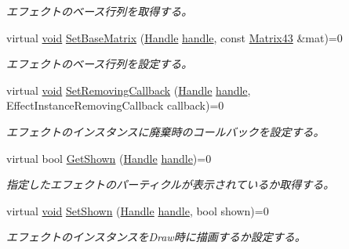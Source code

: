 \begin{DoxyCompactItemize}
\begin{DoxyCompactList}\small\item\em エフェクトのベース行列を取得する。 \end{DoxyCompactList}\item 
virtual \mbox{\hyperlink{namespace_effekseer_ab34c4088e512200cf4c2716f168deb56}{void}} \mbox{\hyperlink{class_effekseer_1_1_manager_a0f94ad0b6cd362283bc216515a89822c}{Set\+Base\+Matrix}} (\mbox{\hyperlink{namespace_effekseer_afba58b8d812da862190e9bbfc040824a}{Handle}} \mbox{\hyperlink{namespace_effekseer_afd99b336b206999bdcca3e431648efbc}{handle}}, const \mbox{\hyperlink{struct_effekseer_1_1_matrix43}{Matrix43}} \&mat)=0
\begin{DoxyCompactList}\small\item\em エフェクトのベース行列を設定する。 \end{DoxyCompactList}\item 
virtual \mbox{\hyperlink{namespace_effekseer_ab34c4088e512200cf4c2716f168deb56}{void}} \mbox{\hyperlink{class_effekseer_1_1_manager_a62c24747994008dfcb84a0adcd53b3ad}{Set\+Removing\+Callback}} (\mbox{\hyperlink{namespace_effekseer_afba58b8d812da862190e9bbfc040824a}{Handle}} \mbox{\hyperlink{namespace_effekseer_afd99b336b206999bdcca3e431648efbc}{handle}}, Effect\+Instance\+Removing\+Callback callback)=0
\begin{DoxyCompactList}\small\item\em エフェクトのインスタンスに廃棄時のコールバックを設定する。 \end{DoxyCompactList}\item 
virtual bool \mbox{\hyperlink{class_effekseer_1_1_manager_a200e7b1812c128a4d88cca7d1be57c0e}{Get\+Shown}} (\mbox{\hyperlink{namespace_effekseer_afba58b8d812da862190e9bbfc040824a}{Handle}} \mbox{\hyperlink{namespace_effekseer_afd99b336b206999bdcca3e431648efbc}{handle}})=0
\begin{DoxyCompactList}\small\item\em 指定したエフェクトのパーティクルが表示されているか取得する。 \end{DoxyCompactList}\item 
virtual \mbox{\hyperlink{namespace_effekseer_ab34c4088e512200cf4c2716f168deb56}{void}} \mbox{\hyperlink{class_effekseer_1_1_manager_ad204b93de6e5c7a05c63cad0115c20d5}{Set\+Shown}} (\mbox{\hyperlink{namespace_effekseer_afba58b8d812da862190e9bbfc040824a}{Handle}} \mbox{\hyperlink{namespace_effekseer_afd99b336b206999bdcca3e431648efbc}{handle}}, bool shown)=0
\begin{DoxyCompactList}\small\item\em エフェクトのインスタンスを\+Draw時に描画するか設定する。 \end{DoxyCompactList}\item 

\end{DoxyCompactItemize}
